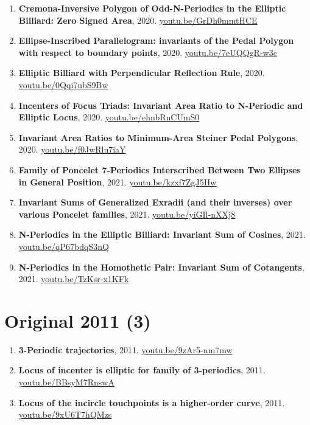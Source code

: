 \documentclass[12pt]{article}
\begin{document}
\begin{enumerate}[resume]
\item \textbf{Cremona-Inversive Polygon of Odd-N-Periodics in the Elliptic Billiard: Zero Signed Area}, 2020. \href{https://youtu.be/GrDh0mmtHCE}{\url{youtu.be/GrDh0mmtHCE}}
\item \textbf{Ellipse-Inscribed Parallelogram: invariants of the Pedal Polygon with respect to boundary points}, 2020. \href{https://youtu.be/7eUQQgR-w3c}{\url{youtu.be/7eUQQgR-w3c}}
\item \textbf{Elliptic Billiard with Perpendicular Reflection Rule}, 2020. \href{https://youtu.be/0Qqi7ubS9Bw}{\url{youtu.be/0Qqi7ubS9Bw}}
\item \textbf{Incenters of Focus Triads: Invariant Area Ratio to N-Periodic and Elliptic Locus}, 2020. \href{https://youtu.be/ehnbRnCUmS0}{\url{youtu.be/ehnbRnCUmS0}}
\item \textbf{Invariant Area Ratios to Minimum-Area Steiner Pedal Polygons}, 2020. \href{https://youtu.be/f0JwRlu7iaY}{\url{youtu.be/f0JwRlu7iaY}}
\item \textbf{Family of Poncelet 7-Periodics Interscribed Between Two Ellipses in General Position}, 2021. \href{https://youtu.be/kzxf7ZgJ5Hw}{\url{youtu.be/kzxf7ZgJ5Hw}}
\item \textbf{Invariant Sums of Generalized Exradii (and their inverses) over various Poncelet families}, 2021. \href{https://youtu.be/yiGIl-nXXj8}{\url{youtu.be/yiGIl-nXXj8}}
\item \textbf{N-Periodics in the Elliptic Billiard: Invariant Sum of Cosines}, 2021. \href{https://youtu.be/qP67bdqS3nQ}{\url{youtu.be/qP67bdqS3nQ}}
\item \textbf{N-Periodics in the Homothetic Pair: Invariant Sum of Cotangents}, 2021. \href{https://youtu.be/TzKsr-x1KFk}{\url{youtu.be/TzKsr-x1KFk}}
\end{enumerate}

\section{Original 2011 (3)}

\begin{enumerate}[resume]
\item \textbf{3-Periodic trajectories}, 2011. \href{https://youtu.be/9zAr5-nm7mw}{\url{youtu.be/9zAr5-nm7mw}}
\item \textbf{Locus of incenter is elliptic for family of 3-periodics}, 2011. \href{https://youtu.be/BBsyM7RnswA}{\url{youtu.be/BBsyM7RnswA}}
\item \textbf{Locus of the incircle touchpoints is a higher-order curve}, 2011. \href{https://youtu.be/9xU6T7hQMzs}{\url{youtu.be/9xU6T7hQMzs}}
\end{enumerate}
\end{document}
